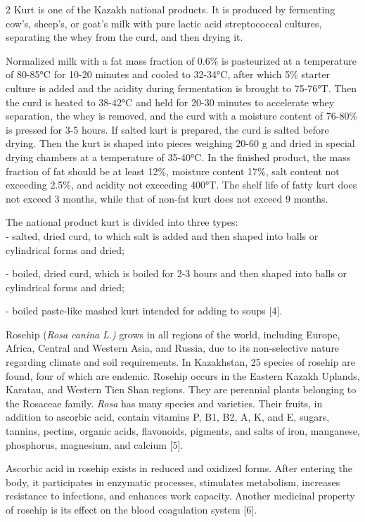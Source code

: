 \begin{multicols}{2}
Kurt is one of the Kazakh national products. It is produced by
fermenting cow's, sheep's, or goat's milk with pure lactic acid
streptococcal cultures, separating the whey from the curd, and then
drying it.

Normalized milk with a fat mass fraction of 0.6\% is pasteurized at a
temperature of 80-85°C for 10-20 minutes and cooled to 32-34°C, after
which 5\% starter culture is added and the acidity during fermentation
is brought to 75-76°T. Then the curd is heated to 38-42°C and held for
20-30 minutes to accelerate whey separation, the whey is removed, and
the curd with a moisture content of 76-80\% is pressed for 3-5 hours. If
salted kurt is prepared, the curd is salted before drying. Then the kurt
is shaped into pieces weighing 20-60 g and dried in special drying
chambers at a temperature of 35-40°C. In the finished product, the mass
fraction of fat should be at least 12\%, moisture content 17\%, salt
content not exceeding 2.5\%, and acidity not exceeding 400°T. The shelf
life of fatty kurt does not exceed 3 months, while that of non-fat kurt
does not exceed 9 months.

The national product kurt is divided into three types:\\
- salted, dried curd, to which salt is added and then shaped into balls
or cylindrical forms and dried;

- boiled, dried curd, which is boiled for 2-3 hours and then shaped into
balls or cylindrical forms and dried;

- boiled paste-like mashed kurt intended for adding to soups {[}4{]}.

Rosehip (\emph{Rosa canina} \emph{L.)} grows in all regions of the
world, including Europe, Africa, Central and Western Asia, and Russia,
due to its non-selective nature regarding climate and soil requirements.
In Kazakhstan, 25 species of rosehip are found, four of which are
endemic. Rosehip occurs in the Eastern Kazakh Uplands, Karatau, and
Western Tien Shan regions. They are perennial plants belonging to the
Rosaceae family. \emph{Rosa} has many species and varieties. Their
fruits, in addition to ascorbic acid, contain vitamins P, B1, B2, A, K,
and E, sugars, tannins, pectins, organic acids, flavonoids, pigments,
and salts of iron, manganese, phosphorus, magnesium, and calcium
{[}5{]}.

Ascorbic acid in rosehip exists in reduced and oxidized forms. After
entering the body, it participates in enzymatic processes, stimulates
metabolism, increases resistance to infections, and enhances work
capacity. Another medicinal property of rosehip is its effect on the
blood coagulation system {[}6{]}.


\end{multicols}
